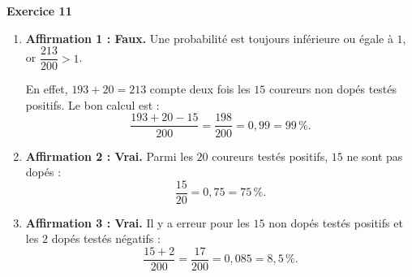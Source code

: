 \documentclass[a4paper,11pt]{article}
\newenvironment{exercice}[1]{%
  \Needspace{6\baselineskip}\par\bigskip\noindent\textbf{Exercice #1}\par\smallskip\noindent\ignorespaces
}{%
  \par
}
\begin{document}
\begin{exercice}{11}
\begin{enumerate}[label=(\alph*)]
\item \textbf{Affirmation 1 : Faux.} Une probabilité est toujours inférieure ou égale à $1$, or $\dfrac{213}{200}>1$.

En effet, $193+20=213$ compte deux fois les $15$ coureurs non dopés testés positifs. Le bon calcul est :
\[\dfrac{193+20-15}{200}=\dfrac{198}{200}=0{,}99=99\,\%.\]
\item \textbf{Affirmation 2 : Vrai.} Parmi les $20$ coureurs testés positifs, $15$ ne sont pas dopés :
\[\dfrac{15}{20}=0{,}75=75\,\%.\]
\item \textbf{Affirmation 3 : Vrai.} Il y a erreur pour les $15$ non dopés testés positifs et les $2$ dopés testés négatifs :
\[\dfrac{15+2}{200}=\dfrac{17}{200}=0{,}085=8{,}5\,\%.\]
\end{enumerate}
\end{exercice}
\end{document}
